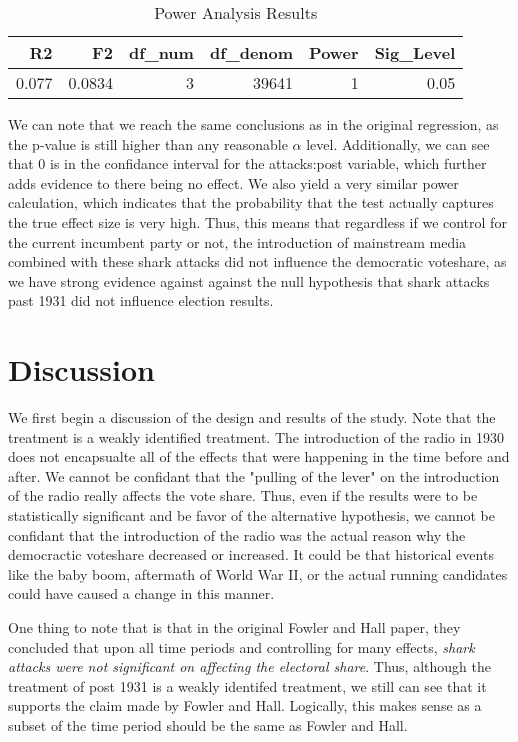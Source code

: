 \documentclass[12pt]{article}
\begin{document}
\begin{table}[H]
    \caption{Power Analysis Results}
    \centering
    \begin{tabular}[t]{rrrrrr}
    \toprule
    R2 & F2 & df\_num & df\_denom & Power & Sig\_Level\\
    \midrule
    0.077 & 0.0834 & 3 & 39641 & 1 & 0.05\\
    \bottomrule
    \end{tabular}
\end{table}
We can note that we reach the same conclusions as in the original regression, as the p-value is still higher than any reasonable $\alpha$ level. Additionally, we can see that 0 is in the confidance interval for the attacks:post variable, which further adds evidence to there being no effect. We also yield a  very similar power calculation, which indicates that the probability that the test actually captures the true effect size is very high. Thus, this means that regardless if we control for the current incumbent party or not, the introduction of mainstream media combined with these shark attacks did not influence the democratic voteshare, as we have strong evidence against against the null hypothesis that shark attacks past 1931 did not influence election results. 
\newpage 
\section{Discussion}
We first begin a discussion of the design and results of the study. Note that the treatment is a weakly identified treatment. The introduction of the radio in 1930 does not encapsualte all of the effects that were happening in the time before and after. We cannot be confidant that the "pulling of the lever" on the introduction of the radio really affects the vote share. Thus, even if the results were to be statistically significant and be favor of the alternative hypothesis, we cannot be confidant that the introduction of the radio was the actual reason why the democractic voteshare decreased or increased. It could be that historical events like the baby boom, aftermath of World War II, or the actual running candidates could have caused a change in this manner. 


One thing to note that is that in the original Fowler and Hall paper, they concluded that upon all time periods and controlling for many effects, \emph{shark attacks were not significant on affecting the electoral share}. Thus, although the treatment of post 1931 is a weakly identifed treatment, we still can see that it supports the claim made by Fowler and Hall. Logically, this makes sense as a subset of the time period should be the same as Fowler and Hall. 
\end{document}
